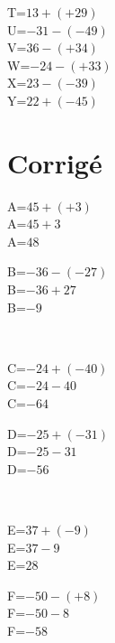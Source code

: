 \documentclass{article}%
\begin{document}
\vspace{0.35cm}%
T=$13+(+29)$\\%
\vspace{0.35cm}%
U=$-31-(-49)$\\%
\vspace{0.35cm}%
V=$36-(+34)$\\%
\vspace{0.35cm}%
W=$-24-(+33)$\\%
\vspace{0.35cm}%
X=$23-(-39)$\\%
\vspace{0.35cm}%
Y=$22+(-45)$\\%
\vspace{0.35cm}

%
\newpage%
\section{Corrigé}%
\label{sec:Corrig}%
\begin{minipage}{0.5\textwidth}%
A=$45+(+3)$\\%
A=$45+3$\\%
A=$48$\\%
\end{minipage}%
\begin{minipage}{0.5\textwidth}%
B=$-36-(-27)$\\%
B=$-36+27$\\%
B=$-9$\\%
\end{minipage}%
\\%
\begin{minipage}{0.5\textwidth}%
C=$-24+(-40)$\\%
C=$-24-40$\\%
C=$-64$\\%
\end{minipage}%
\begin{minipage}{0.5\textwidth}%
D=$-25+(-31)$\\%
D=$-25-31$\\%
D=$-56$\\%
\end{minipage}%
\\%
\begin{minipage}{0.5\textwidth}%
E=$37+(-9)$\\%
E=$37-9$\\%
E=$28$\\%
\end{minipage}%
\begin{minipage}{0.5\textwidth}%
F=$-50-(+8)$\\%
F=$-50-8$\\%
F=$-58$\\%
\end{minipage}%
\end{document}
